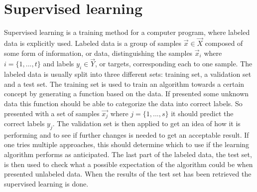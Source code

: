 \section{Supervised learning}
Supervised learning is a training method for a computer program, where labeled data is explicitly used. Labeled data is a group of samples $\vec{x} \in \vec{X} $ composed of some form of information, or data, distinguishing the samples $\vec{x}_i $ where $i = \{1,...,t\} $ and labels $y_i \in \vec{Y}$, or targets, corresponding each to one sample. The labeled data is usually split into three different sets: training set, a validation set and a test set. The training set is used to train an algorithm towards a certain concept by generating a function based on the data. If presented some unknown data this function should be able to categorize the data into correct labels. So presented with a set of samples $\vec{x_j}$ where $j = \{1,...,s\}$ it should predict the correct labels $y_j$. The validation set is then applied to get an idea of how it is performing and to see if further changes is needed to get an acceptable result. If one tries multiple approaches, this should determine which to use if the learning algorithm performs as anticipated. The last part of the labeled data, the test set, is then used to check what a possible expectation of the algorithm could be when presented unlabeled data. When the results of the test set has been retrieved the supervised learning is done. 
